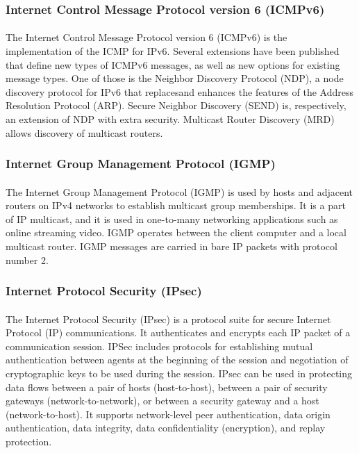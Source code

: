 \subsubsection*{Internet Control Message Protocol version 6 (ICMPv6)\cite{ICMPv6}}
\paragraph{}The Internet Control Message Protocol version 6 (ICMPv6) is the implementation of the ICMP for IPv6. Several extensions have been published that define new types of ICMPv6 messages, as well as new options for existing message types. One of those is the Neighbor Discovery Protocol (NDP), a node discovery protocol for IPv6 that replacesand enhances the features of the Address Resolution Protocol (ARP). Secure Neighbor Discovery (SEND) is, respectively, an extension of NDP with extra security. Multicast Router Discovery (MRD) allows discovery of multicast routers.

\subsubsection*{Internet Group Management Protocol (IGMP)\cite{IGMP}}
\paragraph{}The Internet Group Management Protocol (IGMP) is used by hosts and adjacent routers on IPv4 networks to establish multicast group memberships. It is a part of IP multicast, and it is used in one-to-many networking applications such as online streaming video. IGMP operates between the client computer and a local multicast router. IGMP messages are carried in bare IP packets with protocol number 2.

\subsubsection*{Internet Protocol Security (IPsec)\cite{IPsec}}
\paragraph{}The Internet Protocol Security (IPsec) is a protocol suite for secure Internet Protocol (IP) communications. It authenticates and encrypts each IP packet of a communication session. IPSec includes protocols for establishing mutual authentication between agents at the beginning of the session and negotiation of cryptographic keys to be used during the session. IPsec can be used in protecting data flows between a pair of hosts (host-to-host), between a pair of security gateways (network-to-network), or between a security gateway and a host (network-to-host). It supports network-level peer authentication, data origin authentication, data integrity, data confidentiality (encryption), and replay protection.
